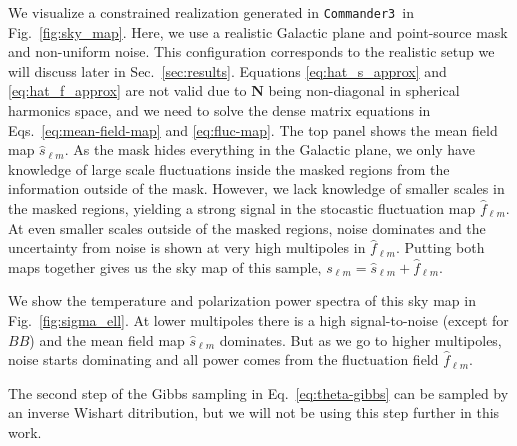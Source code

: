 \documentclass[twocolumn]{../common/aa}
\def\commanderthree{\texttt{Commander3}}
\begin{document}
We visualize a constrained realization generated in \commanderthree\ in Fig.~\ref{fig:sky_map}. Here, we use a realistic Galactic plane and point-source mask and non-uniform noise. This configuration corresponds to the realistic setup we will discuss later in Sec.~\ref{sec:results}. Equations \eqref{eq:hat_s_approx} and \eqref{eq:hat_f_approx} are not valid due to $\boldsymbol{N}$ being non-diagonal in spherical harmonics space, and we need to solve the dense matrix equations in Eqs.~\ref{eq:mean-field-map} and \ref{eq:fluc-map}. The top panel shows the mean field map $\hat{s}_{\ell m}$. As the mask hides everything in the Galactic plane, we only have knowledge of large scale fluctuations inside the masked regions from the information outside of the mask. However, we lack knowledge of smaller scales in the masked regions, yielding a strong signal in the stocastic fluctuation map $\hat{f}_{\ell m}$. At even smaller scales outside of the masked regions, noise dominates and the uncertainty from noise is shown at very high multipoles in $\hat{f}_{\ell m}$. Putting both maps together gives us the sky map of this sample, $s_{\ell m} = \hat{s}_{\ell m} + \hat{f}_{\ell m}$.

We show the temperature and polarization power spectra of this sky map in Fig.~\ref{fig:sigma_ell}. At lower multipoles there is a high signal-to-noise (except for $BB$) and the mean field map $\hat{s}_{\ell m}$ dominates. But as we go to higher multipoles, noise starts dominating and all power comes from the fluctuation field $\hat{f}_{\ell m}$.

The second step of the Gibbs sampling in Eq.~\eqref{eq:theta-gibbs} can be sampled by an inverse Wishart ditribution, but we will not be using this step further in this work.
\end{document}

